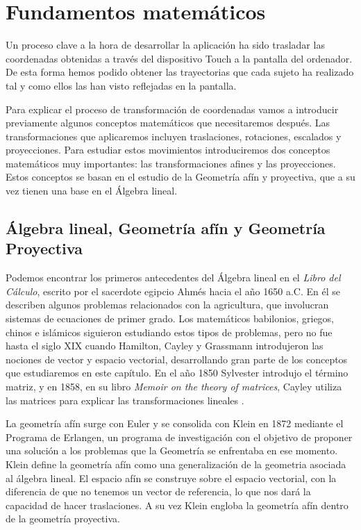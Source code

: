 \documentclass[a4paper,11pt, oneside]{book}
\begin{document}
\chapter{Fundamentos matemáticos}

Un proceso clave a la hora de desarrollar la aplicación ha sido trasladar las coordenadas obtenidas a través del dispositivo Touch a la pantalla del ordenador. De esta forma hemos podido obtener las trayectorias que cada sujeto ha realizado tal y como ellos las han visto reflejadas en la pantalla. 

Para explicar el proceso de transformación de coordenadas vamos a introducir previamente algunos conceptos matemáticos que necesitaremos después. Las transformaciones que aplicaremos incluyen traslaciones, rotaciones, escalados y proyecciones. Para estudiar estos movimientos introduciremos dos conceptos matemáticos muy importantes: las transformaciones afines y las proyecciones. Estos conceptos se basan en el estudio de la Geometría afín y proyectiva, que a su vez tienen una base en el Álgebra lineal. 


\section{Álgebra lineal, Geometría afín y Geometría Proyectiva}
Podemos encontrar los primeros antecedentes del Álgebra lineal en el \textit{Libro del Cálculo}, escrito por el sacerdote egipcio Ahmés hacia el año 1650 a.C. En él se describen algunos problemas relacionados con la agricultura, que involucran sistemas de ecuaciones de primer grado. Los matemáticos babilonios, griegos, chinos e islámicos siguieron estudiando estos tipos de problemas, pero no fue hasta el siglo  XIX cuando Hamilton, Cayley y Grassmann introdujeron las nociones de vector y espacio vectorial, desarrollando gran parte de los conceptos que estudiaremos en este capítulo. En el año 1850 Sylvester introdujo el término matriz, y en 1858, en su libro \textit{Memoir on the theory of matrices}, Cayley utiliza las matrices para explicar las transformaciones lineales \cite{historia}.

La geometría afín surge con Euler y se consolida con Klein en 1872 mediante el Programa de Erlangen, un programa de investigación con el objetivo de proponer una solución a los problemas que la Geometría se enfrentaba en ese momento. Klein define la geometría afín como una generalización de la geometria asociada al álgebra lineal. El espacio afín se construye sobre el espacio vectorial, con la diferencia de que no tenemos un vector de referencia, lo que nos dará la capacidad de hacer traslaciones. A su vez Klein engloba la geometría afín dentro de la geometría proyectiva.
\end{document}
